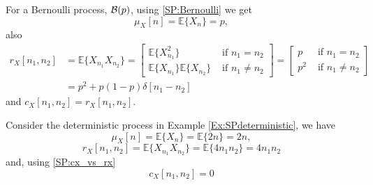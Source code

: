 \begin{example}
\label{Ex:BinaryRandom2}

For a Bernoulli process, ${\cal B}(p)$, using \eqref{SP:Bernoulli} we get
\begin{equation}
\mu_X[n] = \mathbb{E}\{X_n\} = p,
\label{ec:Mean_b}
\end{equation}
also 
\begin{align}
r_X[n_1,n_2] 
	&= \mathbb{E}\{X_{n_1}X_{n_2}\}
     = \left[\begin{array}{ll}
        \mathbb{E}\{X_{n_1}^2\}                     & \mbox{ if } n_1 = n_2 \\
        \mathbb{E}\{X_{n_1}\} \mathbb{E}\{X_{n_2}\} & \mbox{ if } n_1\neq n_2
       \end{array}
      \right]
     = \left[\begin{array}{ll}
        p   & \mbox{ if } n_1 = n_2 \\
        p^2 & \mbox{ if } n_1\neq n_2
      \end{array}
    \right]    \nonumber\\
    &= p^2 + p(1-p) \delta[n_1-n_2]
\label{ec:r_b}
\end{align}
and $c_X[n_1,n_2] = r_X[n_1, n_2]$.

\end{example}

\begin{example}
\label{Ex:SPdeterministic2}

Consider the deterministic process in Example \ref{Ex:SPdeterministic}, we have
\begin{equation}
\mu_X[n] = \mathbb{E}\{X_n\} = \mathbb{E}\{2n\} = 2n,
\end{equation}
\begin{equation}
r_X[n_1,n_2] = \mathbb{E}\{X_{n_1} X_{n_2}\} = \mathbb{E}\{4 n_1 n_2\} = 4 n_1 n_2
\label{RxDeterministic}
\end{equation}
and, using \eqref{SP:cx_vs_rx}
\begin{equation}
c_X[n_1,n_2] = 0
\label{RxDeterministic}
\end{equation}

\end{example}


